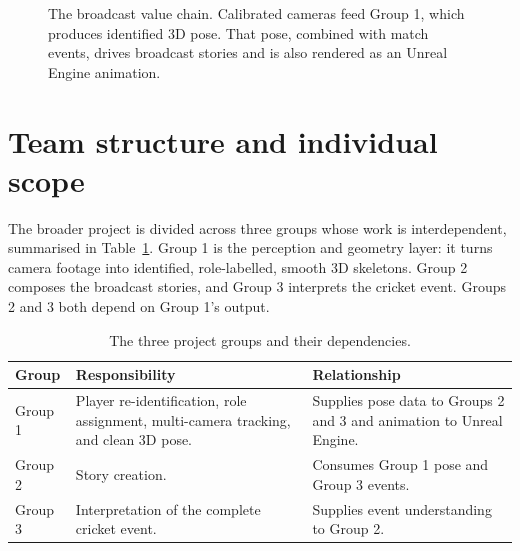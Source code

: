 \documentclass[oneside,openany]{book}
\begin{document}
\begin{figure}[ht]
\begin{center}
\caption{The broadcast value chain. Calibrated cameras feed Group 1, which produces identified
3D pose. That pose, combined with match events, drives broadcast stories and is also rendered as
an Unreal Engine animation.}
\label{fig:valuechain}
\end{center}
\end{figure}

\section{Team structure and individual scope}
The broader project is divided across three groups whose work is interdependent, summarised in
Table~\ref{tab:groups}. Group 1 is the perception and geometry layer: it turns camera footage
into identified, role-labelled, smooth 3D skeletons. Group 2 composes the broadcast stories,
and Group 3 interprets the cricket event. Groups 2 and 3 both depend on Group 1's output.

\begin{table}[!h]
	\begin{center}
		\caption{The three project groups and their dependencies.}
		\label{tab:groups}
		\footnotesize
		\begin{tabular}{p{1.6cm}p{6.4cm}p{6.0cm}}
			\toprule
			\textbf{Group} & \textbf{Responsibility} & \textbf{Relationship} \\
			\midrule
			Group 1 & Player re-identification, role assignment, multi-camera tracking, and clean
			3D pose. & Supplies pose data to Groups 2 and 3 and animation to Unreal Engine. \\
			Group 2 & Story creation. & Consumes Group 1 pose and Group 3 events. \\
			Group 3 & Interpretation of the complete cricket event. & Supplies event understanding
			to Group 2. \\
			\bottomrule
		\end{tabular}
	\end{center}
\end{table}
\end{document}
